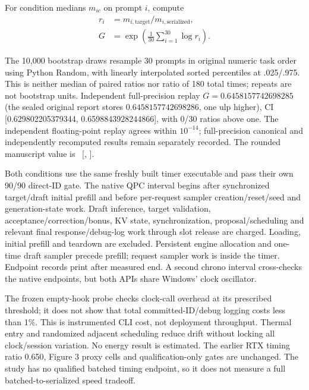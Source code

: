 \begin{samepage}
For condition medians $m_{ic}$ on prompt $i$, compute
\[
\begin{aligned}
r_i&=m_{i,\mathrm{target}}/m_{i,\mathrm{serialized}},\\
G&=\exp\!\left(\frac1{30}\sum_{i=1}^{30}\log r_i\right).
\end{aligned}
\]
\end{samepage}
The 10,000 bootstrap draws resample 30 prompts in original numeric task order using Python Random, with linearly interpolated sorted percentiles at .025/.975. This is neither median of paired ratios nor ratio of 180 total times; repeats are not bootstrap units. Independent full-precision replay $G=0.6458157742698285$ (the sealed original report stores $0.6458157742698286$, one ulp higher), CI [0.629802205379344, 0.6598843928244866], with 0/30 ratios above one. The independent floating-point replay agrees within $10^{-14}$; full-precision canonical and independently recomputed results remain separately recorded. The rounded manuscript value is \FUCost\ [\FUCostLo, \FUCostHi].

Both conditions use the same freshly built timer executable and pass their own 90/90 direct-ID gate. The native QPC interval begins after synchronized target/draft initial prefill and before per-request sampler creation/reset/seed and generation-state work. Draft inference, target validation, acceptance/correction/bonus, KV state, synchronization, proposal/scheduling and relevant final response/debug-log work through slot release are charged. Loading, initial prefill and teardown are excluded. Persistent engine allocation and one-time draft sampler precede prefill; request sampler work is inside the timer. Endpoint records print after measured end. A second chrono interval cross-checks the native endpoints, but both APIs share Windows' clock oscillator.

The frozen empty-hook probe checks clock-call overhead at its prescribed threshold; it does not show that total committed-ID/debug logging costs less than 1\%. This is instrumented CLI cost, not deployment throughput. Thermal entry and randomized adjacent scheduling reduce drift without locking all clock/session variation. No energy result is estimated. The earlier RTX timing ratio 0.650, Figure 3 proxy cells and qualification-only gates are unchanged. The study has no qualified batched timing endpoint, so it does not measure a full batched-to-serialized speed tradeoff.

